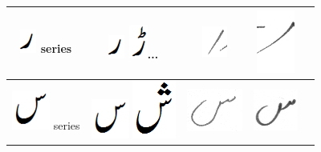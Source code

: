 \begin{table}[h]
\begin{tabular}{@{}ccccc@{}}
\includegraphics[scale=0.25]{re_orig} series & \includegraphics[scale=0.25]{re_orig} \includegraphics[scale=0.25]{R'e}... & \includegraphics[scale=0.20]{11} &
\includegraphics[scale=0.15]{12} &  \\ 
\hline
\includegraphics[scale=0.25]{seen_orig} series & \includegraphics[scale=0.25]{seen_orig} \includegraphics[scale=0.25]{sheen} & \includegraphics[scale=0.25]{13} &
\includegraphics[scale=0.25]{14} & \\ 
\hline

\end{tabular}
\end{table}
